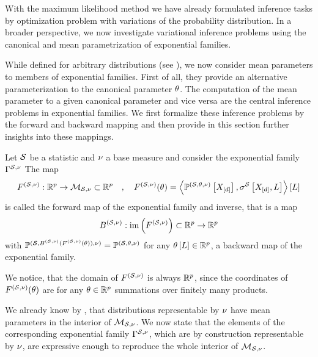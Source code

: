 
With the maximum likelihood method we have already formulated inference tasks by optimization problem with variations of the probability distribution.
In a broader perspective, we now investigate variational inference problems using the canonical and mean parametrization of exponential families.


While defined for arbitrary distributions (see ), we now consider mean parameters to members of exponential families.
First of all, they provide an alternative parameterization to the canonical parameter $\theta$.
The computation of the mean parameter to a given canonical parameter and vice versa are the central inference problems in exponential families.
We first formalize these inference problems by the forward and backward mapping and then provide in this section further insights into these mappings.

\begin{definition}
    \label{def:meanForwardBackward}
    Let $\mathcal{S}$ be a statistic and $\nu$ a base measure and consider the exponential family $\Gamma^{\mathcal{S},\nu}$
    The map
    \begin{align*}
        F^{(\mathcal{S},\nu)} : \mathbb{R}^{p}\rightarrow\mathcal{M}_{\mathcal{S},\nu}\subset\mathbb{R}^{p}
        \quad,\quad F^{(\mathcal{S},\nu)}(\theta) = \left\langle \mathbb{P}^{(\mathcal{S},\theta,\nu)}\left[X_{[d]}\right],\sigma^{\mathcal{S}}\left[X_{[d]},L\right]\right\rangle \left[ L \right]
    \end{align*}
    is called the forward map of the exponential family and inverse, that is a map
    \begin{align*}
        B^{(\mathcal{S},\nu)} : \mathrm{im}\left(F^{(\mathcal{S},\nu)}\right) \subset\mathbb{R}^{p}\rightarrow \mathbb{R}^{p}
    \end{align*}
    with $\mathbb{P}^{(\mathcal{S},B^{(\mathcal{S},\nu)}(F^{(\mathcal{S},\nu)}(\theta)),\nu)} = \mathbb{P}^{(\mathcal{S},\theta,\nu)}$ for any $\theta\left[L\right]\in\mathbb{R}^{p}$, a backward map of the exponential family.
\end{definition}

We notice, that the domain of $F^{(\mathcal{S},\nu)}$ is always $\mathbb{R}^{p}$, since the coordinates of $F^{(\mathcal{S},\nu)}(\theta)$ are for any $\theta\in\mathbb{R}^{p}$ summations over finitely many products.

%
We already know by , that distributions representable by $\nu$ have mean parameters in the interior of $\mathcal{M}_{\mathcal{S},\nu}$.
We now state that the elements of the corresponding exponential family $\Gamma^{\mathcal{S},\nu}$, which are by construction representable by $\nu$, are expressive enough to reproduce the whole interior of $\mathcal{M}_{\mathcal{S},\nu}$.

